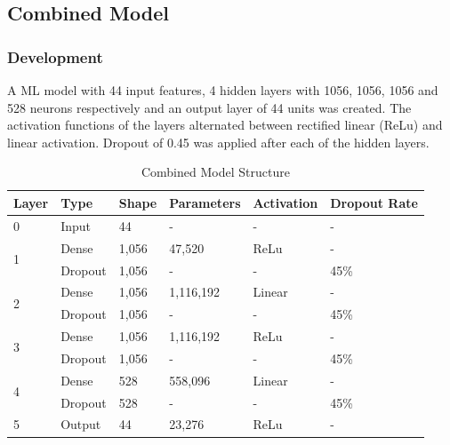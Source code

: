 \FloatBarrier
\subsection{Combined Model} \label{sub:sec:comb_mod}

\subsubsection{Development}


A ML model with 44 input features, 4 hidden layers with 1056, 1056, 1056 and 528 neurons respectively and an output layer of 44 units was created. The activation functions of the layers alternated between rectified linear (ReLu) and linear activation.  Dropout of 0.45 was applied after each of the hidden layers.


\begin{table}[!h]
    \centering
    \caption{Combined Model Structure}
    \begin{tabular}{l l l l l l }
        \textbf{Layer} & \textbf{Type} & \textbf{Shape} & \textbf{Parameters} & \textbf{Activation} & \textbf{Dropout Rate} \\
        \hline
        0 & Input & 44 & - & - & - \\
        \hline
        \multirow[t]{2}{*}{1} & Dense & 1,056 & 47,520 & ReLu  & - \\ \cline{2-6}
        
        & Dropout & 1,056 & - & - & 45\% \\
        \hline
        \multirow[t]{2}{*}{2} & Dense & 1,056 & 1,116,192 & Linear  & - \\  \cline{2-6}
        
        & Dropout & 1,056 & - & - & 45\% \\
        \hline
        \multirow[t]{2}{*}{3} &  Dense & 1,056 & 1,116,192 & ReLu  & - \\ \cline{2-6}
        
        & Dropout & 1,056 & - & - & 45\% \\
        \hline
        \multirow[t]{2}{*}{4} & Dense & 528 & 558,096 & Linear  & - \\ \cline{2-6}
        
        & Dropout & 528 & - & - & 45\% \\
        \hline
        5 &Output & 44 & 23,276 & ReLu & - \\
        \hline
    \end{tabular}
    \label{tab:combined_model_struct}
\end{table}

